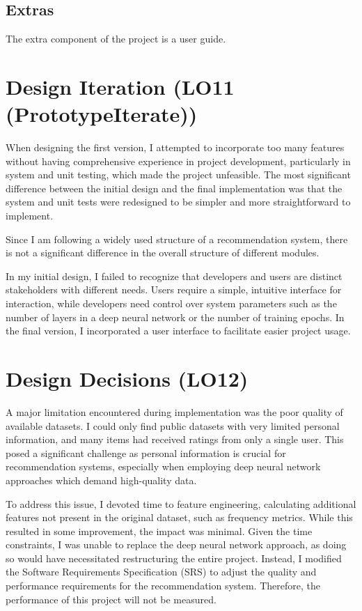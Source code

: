 \documentclass{article}
\begin{document}
\subsection{Extras}

The extra component of the project is a user guide.

\section{Design Iteration (LO11 (PrototypeIterate))}

When designing the first version, I attempted to incorporate too many features without having comprehensive experience in project development, particularly in system and unit testing, which made the project unfeasible. The most significant difference between the initial design and the final implementation was that the system and unit tests were redesigned to be simpler and more straightforward to implement.

Since I am following a widely used structure of a recommendation system, there is not a significant difference in the overall structure of different modules.

In my initial design, I failed to recognize that developers and users are distinct stakeholders with different needs. Users require a simple, intuitive interface for interaction, while developers need control over system parameters such as the number of layers in a deep neural network or the number of training epochs. In the final version, I incorporated a user interface to facilitate easier project usage.

\section{Design Decisions (LO12)}

A major limitation encountered during implementation was the poor quality of available datasets. I could only find public datasets with very limited personal information, and many items had received ratings from only a single user. This posed a significant challenge as personal information is crucial for recommendation systems, especially when employing deep neural network approaches which demand high-quality data.

To address this issue, I devoted time to feature engineering, calculating additional features not present in the original dataset, such as frequency metrics. While this resulted in some improvement, the impact was minimal. Given the time constraints, I was unable to replace the deep neural network approach, as doing so would have necessitated restructuring the entire project. Instead, I modified the Software Requirements Specification (SRS) to adjust the quality and performance requirements for the recommendation system. Therefore, the performance of this project will not be measured.
\end{document}
